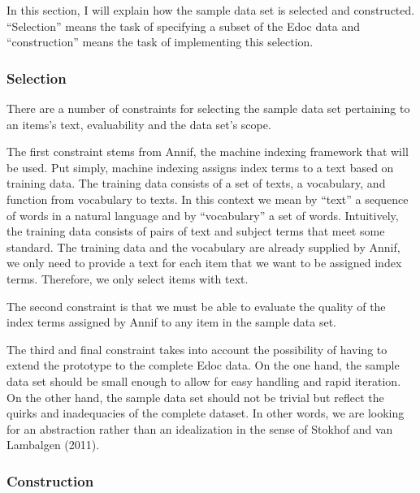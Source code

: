 In this section, I will explain how the sample data set is selected and
constructed. ``Selection'' means the task of specifying a subset of the
Edoc data and ``construction'' means the task of implementing this
selection.

\hypertarget{selection}{%
\subsubsection{Selection}\label{selection}}

There are a number of constraints for selecting the sample data set
pertaining to an items's text, evaluability and the data set's scope.

The first constraint stems from Annif, the machine indexing framework
that will be used. Put simply, machine indexing assigns index terms to a
text based on training data. The training data consists of a set of
texts, a vocabulary, and function from vocabulary to texts. In this
context we mean by ``text'' a sequence of words in a natural language
and by ``vocabulary'' a set of words. Intuitively, the training data
consists of pairs of text and subject terms that meet some standard. The
training data and the vocabulary are already supplied by Annif, we only
need to provide a text for each item that we want to be assigned index
terms. Therefore, we only select items with text.

The second constraint is that we must be able to evaluate the quality of
the index terms assigned by Annif to any item in the sample data set.

The third and final constraint takes into account the possibility of
having to extend the prototype to the complete Edoc data. On the one
hand, the sample data set should be small enough to allow for easy
handling and rapid iteration. On the other hand, the sample data set
should not be trivial but reflect the quirks and inadequacies of the
complete dataset. In other words, we are looking for an abstraction
rather than an idealization in the sense of Stokhof and van Lambalgen
(2011).

\hypertarget{construction}{%
\subsubsection{Construction}\label{construction}}

